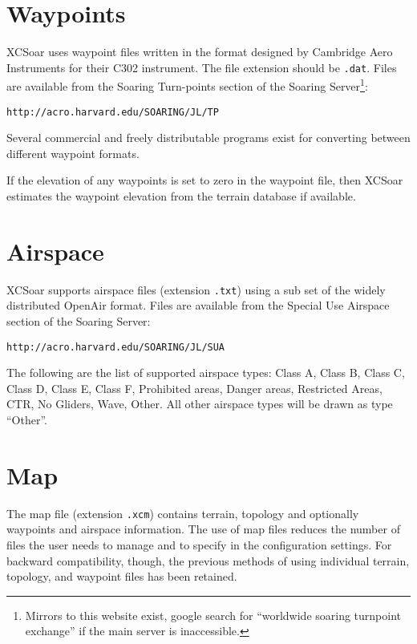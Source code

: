 \section{Waypoints}

XCSoar uses waypoint files written in the format designed by Cambridge
Aero Instruments for their C302 instrument.  The file extension should
be \verb|.dat|.
Files are available from the Soaring Turn-points section of the
Soaring Server\footnote{Mirrors to this website exist, google search
for ``worldwide soaring turnpoint exchange'' if the main server is
inaccessible.}:

\verb|http://acro.harvard.edu/SOARING/JL/TP|

Several commercial and freely distributable programs exist for
converting between different waypoint formats.

If the elevation of any waypoints is set to zero in the waypoint file,
then XCSoar estimates the waypoint elevation from the terrain database
if available.

\section{Airspace}

XCSoar supports airspace files (extension \verb|.txt|) using a sub set
of the widely distributed OpenAir format. Files are available from the
Special Use Airspace section of the Soaring Server:

\verb|http://acro.harvard.edu/SOARING/JL/SUA|


The following are the list of supported airspace types: Class A, Class
B, Class C, Class D, Class E, Class F, Prohibited areas, Danger areas,
Restricted Areas, CTR, No Gliders, Wave, Other.  All other airspace
types will be drawn as type ``Other''.

\section{Map}\label{sec:map}

The map file (extension \verb|.xcm|) contains terrain, topology and
optionally waypoints and airspace information.  The use of map files
reduces the number of files the user needs to manage and to specify in
the configuration settings.  For backward compatibility, though, the
previous methods of using individual terrain, topology, and waypoint
files has been retained.

